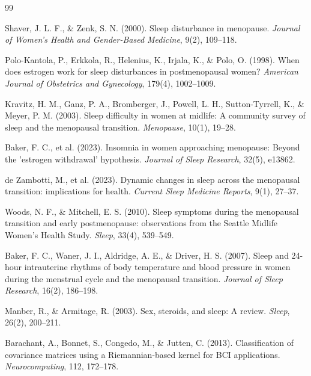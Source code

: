 \documentclass[ASNA,twocolumn]{USG}
\begin{document}
\begin{thebibliography}{99}

 Shaver, J. L. F., \& Zenk, S. N. (2000). Sleep disturbance in menopause. \textit{Journal of Women's Health and Gender-Based Medicine}, 9(2), 109--118.

 Polo-Kantola, P., Erkkola, R., Helenius, K., Irjala, K., \& Polo, O. (1998). When does estrogen work for sleep disturbances in postmenopausal women? \textit{American Journal of Obstetrics and Gynecology}, 179(4), 1002--1009.

 Kravitz, H. M., Ganz, P. A., Bromberger, J., Powell, L. H., Sutton-Tyrrell, K., \& Meyer, P. M. (2003). Sleep difficulty in women at midlife: A community survey of sleep and the menopausal transition. \textit{Menopause}, 10(1), 19--28.

 Baker, F. C., et al. (2023). Insomnia in women approaching menopause: Beyond the 'estrogen withdrawal' hypothesis. \textit{Journal of Sleep Research}, 32(5), e13862.

 de Zambotti, M., et al. (2023). Dynamic changes in sleep across the menopausal transition: implications for health. \textit{Current Sleep Medicine Reports}, 9(1), 27--37.

 Woods, N. F., \& Mitchell, E. S. (2010). Sleep symptoms during the menopausal transition and early postmenopause: observations from the Seattle Midlife Women's Health Study. \textit{Sleep}, 33(4), 539--549.

 Baker, F. C., Waner, J. I., Aldridge, A. E., \& Driver, H. S. (2007). Sleep and 24-hour intrauterine rhythms of body temperature and blood pressure in women during the menstrual cycle and the menopausal transition. \textit{Journal of Sleep Research}, 16(2), 186--198.

 Manber, R., \& Armitage, R. (2003). Sex, steroids, and sleep: A review. \textit{Sleep}, 26(2), 200--211.

 Barachant, A., Bonnet, S., Congedo, M., \& Jutten, C. (2013). Classification of covariance matrices using a Riemannian-based kernel for BCI applications. \textit{Neurocomputing}, 112, 172--178.


\end{thebibliography}
\end{document}
